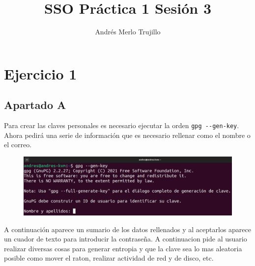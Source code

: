\documentclass{article}
\title{SSO Práctica 1 Sesión 3}
\author{Andrés Merlo Trujillo}
\date{}
\begin{document}
\maketitle

\tableofcontents

\newpage

\section*{Ejercicio 1}

\subsection*{Apartado A}

Para crear las claves personales es necesario ejecutar la orden \verb|gpg --gen-key|. Ahora pedirá una serie de información que es necesario rellenar como el nombre o el correo.

\begin{figure}[H]
    \includegraphics[width=\textwidth]{imagenes/Captura desde 2022-10-19 16-42-45.png}
\end{figure}

A continuación aparece un sumario de los datos rellenados y al aceptarlos aparece un cuador de texto para introducir la contraseña. A continuacion pide al usuario realizar diversas cosas para generar entropia y que la clave sea lo mas aleatoria posible como mover el raton, realizar actividad de red y de disco, etc.
\end{document}

